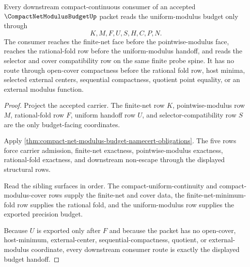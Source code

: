 \begin{theorem}
\label{thm:compact-net-modulus-budget-handoff-exactness}
Every downstream compact-continuous consumer of an accepted $\CompactNetModulusBudgetUp$ packet reads the uniform-modulus budget only through
$$
K,M,F,U,S,H,C,P,N.
$$
The consumer reaches the finite-net face before the pointwise-modulus face, reaches the rational-fold row before the uniform-modulus handoff, and reads the selector and cover compatibility row on the same finite probe spine. It has no route through open-cover compactness before the rational fold row, host minima, selected external centers, sequential compactness, quotient point equality, or an external modulus function.
\end{theorem}
\begin{proof}
Project the accepted carrier. The finite-net row $K$, pointwise-modulus row $M$, rational-fold row $F$, uniform handoff row $U$, and selector-compatibility row $S$ are the only budget-facing coordinates.

Apply \autoref{thm:compact-net-modulus-budget-namecert-obligations}. The five rows force carrier admission, finite-net exactness, pointwise-modulus exactness, rational-fold exactness, and downstream non-escape through the displayed structural rows.

Read the sibling surfaces in order. The compact-uniform-continuity and compact-modulus-cover rows supply the finite-net and cover data, the finite-net-minimum-fold row supplies the rational fold, and the uniform-modulus row supplies the exported precision budget.

Because $U$ is exported only after $F$ and because the packet has no open-cover, host-minimum, external-center, sequential-compactness, quotient, or external-modulus coordinate, every downstream consumer route is exactly the displayed budget handoff.
\end{proof}



